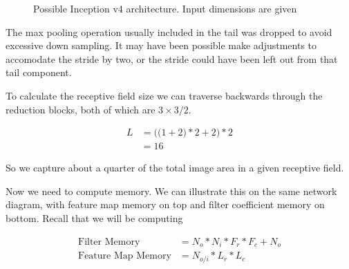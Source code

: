 \documentclass[11pt]{article}
\begin{document}
\begin{solution}
\begin{figure}[H]
{
	}
	\caption{Possible Inception v4 architecture. Input dimensions are given}
	\label{fig:cnn}
\end{figure}

	The max pooling operation usually included in the tail was dropped to avoid
	excessive down sampling. It may have been possible make adjustments to
	accomodate the stride by two, or the stride could have been left out from
	that tail component.
	\newline

	To calculate the receptive field size we can traverse backwards through the
	reduction blocks, both of which are $3 \times 3 / 2$.

	\begin{align}
		L &= \bigg( \Big(1+2\Big)*2+2 \bigg)*2 \\
		&= 16
	\end{align}

	\noindent
	So we capture about a quarter of the total image area in a given receptive
	field.
	\newline

	\noindent
	Now we need to compute memory. We can illustrate this on the same network
	diagram, with feature map memory on top and filter coefficient memory on
	bottom. Recall that we will be computing

	\begin{align}
		\text{Filter Memory} &= N_o * N_i * F_r * F_c + N_o \\
		\text{Feature Map Memory} &= N_{o/i} * L_r * L_c\\
	\end{align}



\begin{figure}[H]
	\noindent{}
\end{figure}
\end{solution}
\end{document}
